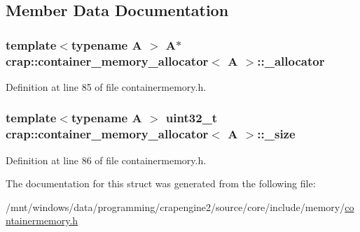\subsection{Member Data Documentation}
\hypertarget{structcrap_1_1container__memory__allocator_a6c4b2c56ca010ac510a93d4f5581ba94}{
\subsubsection[{\+\_\+allocator}]{\setlength{\rightskip}{0pt plus 5cm}template$<$typename A $>$ A$\ast$ {\bf crap\+::container\+\_\+memory\+\_\+allocator}$<$ A $>$\+::\+\_\+allocator}}\label{structcrap_1_1container__memory__allocator_a6c4b2c56ca010ac510a93d4f5581ba94}


Definition at line 85 of file containermemory.\+h.

\hypertarget{structcrap_1_1container__memory__allocator_afb1717450eb7b0b9d03321fa73a5150f}{
\subsubsection[{\+\_\+size}]{\setlength{\rightskip}{0pt plus 5cm}template$<$typename A $>$ uint32\+\_\+t {\bf crap\+::container\+\_\+memory\+\_\+allocator}$<$ A $>$\+::\+\_\+size}}\label{structcrap_1_1container__memory__allocator_afb1717450eb7b0b9d03321fa73a5150f}


Definition at line 86 of file containermemory.\+h.



The documentation for this struct was generated from the following file\+:\begin{DoxyCompactItemize}
\item 
/mnt/windows/data/programming/crapengine2/source/core/include/memory/\hyperlink{containermemory_8h}{containermemory.\+h}\end{DoxyCompactItemize}
